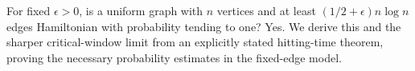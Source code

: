 For fixed $\epsilon>0$, is a uniform graph with $n$ vertices and at least $(1/2+\epsilon)n\log n$ edges Hamiltonian with probability tending to one? Yes. We derive this and the sharper critical-window limit from an explicitly stated hitting-time theorem, proving the necessary probability estimates in the fixed-edge model.
